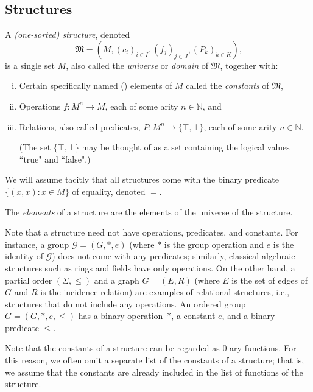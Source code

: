 \documentclass{scrartcl}
\newcommand{\FM}{\mathfrak{M}}
\begin{document}
\subsection{Structures}




\begin{definition}
\label{D:structure}
A \emph{(one-sorted) structure}, denoted 
\[
\mathfrak{M} = (M,(c_i)_{i\in I}, (f_j)_{j\in J}, (P_k)_{k\in K}) \text{,}
\]
is a single set $M$, also called the \emph{universe} or \emph{domain} of  $\mathfrak{M}$, together with:
\begin{enumerate}[i)]
\item Certain specifically named () elements of $M$ called the \emph{constants} of $\FM$,
\item Operations $f\colon M^n\to M$, each of some arity $n\in\mathbb{N}$, and
\item Relations, also called predicates, $P\colon M^n\to \{\top,\bot\}$, each of some arity $n\in\mathbb{N}$.

(The set $\{\top,\bot\}$ may be thought of as a set containing the logical values ``true" and ``false".)

\end{enumerate}

We will assume tacitly that all structures come with the binary predicate $\{(x,x):x\in M\}$ of equality, denoted $=$.


The \emph{elements} of a structure are the elements of the universe of the structure.

\end{definition}

Note that a structure need not have operations, predicates, and constants. For instance, a group $\mathscr{G}=( G, *, e)$ (where $*$ is the group operation and $e$ is the identity of $\mathscr{G}$) does not come with any predicates; similarly, classical algebraic structures such as rings and fields have only operations. On the other hand, a partial order $(\Sigma,\le)$ and a graph $G=(E,R)$ (where $E$ is the set of edges of $G$ and $R$ is the incidence relation) are examples of relational structures, i.e., structures that do not include any operations. An ordered group $G=( G, *, e, \le)$ has a binary operation~$*$, a constant $e$, and a binary predicate $\le$.


Note that the constants of a structure can be regarded as $0$-ary functions. For this reason, we often omit a separate list of the constants of a structure; that is, we assume that the constants are already included in the list of functions of the structure.
\end{document}
